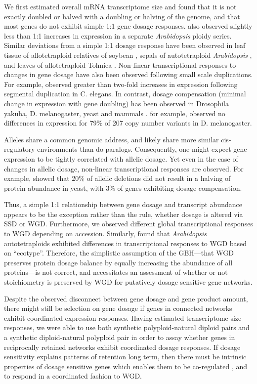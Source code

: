 \documentclass[11pt]{article}
\begin{document}
We first estimated overall mRNA transcriptome size and found that it is not exactly doubled or halved with a doubling or halving of the genome, and that most genes do not exhibit simple 1:1 gene dosage responses. \cite{hou2018} also observed slightly less than 1:1 increases in expression in a separate {\it Arabidopsis} ploidy series. Similar deviations from a simple 1:1 dosage response have been observed in leaf tissue of allotetraploid relatives of soybean \citep{coate2010}, sepals of autotetraploid {\it Arabidopsis} \citep{robinson2018}, and leaves of allotetraploid Tolmiea \citep{visger2019}. 
Non-linear transcriptional responses to changes in gene dosage have also been observed following small scale duplications. For example, \cite{konrad2018} observed greater than two-fold increases in expression following segmental duplication in C. elegans. In contrast, dosage compensation (minimal change in expression with gene doubling) has been observed in Drosophila yakuba, D. melanogaster, yeast and mammals \citep{qian2010, rogers2017, zhou2011}. \cite{zhou2011} for example, observed no differences in expression for 79\% of 207 copy number variants in D. melanogaster. 

Alleles share a common genomic address, and likely share more similar cis-regulatory environments than do paralogs. Consequently, one might expect gene expression to be tightly correlated with allelic dosage. Yet even in the case of changes in allelic dosage, non-linear transcriptional responses are observed. For example, \cite{springer2010} showed that 20\% of allelic deletions did not result in a halving of protein abundance in yeast, with 3\% of genes exhibiting dosage compensation. 

Thus, a simple 1:1 relationship between gene dosage and transcript abundance appears to be the exception rather than the rule, whether dosage is altered via SSD or WGD. Furthermore, we observed different global transcriptional responses to WGD depending on accession. Similarly, \cite{yu2010} found that {\it Arabidopsis} autotetraploids exhibited differences in transcriptional responses to WGD based on ``ecotype''. Therefore, the simplistic assumption of the GBH---that WGD preserves protein dosage balance by equally increasing the abundance of all proteins---is not correct, and necessitates an assessment of whether or not stoichiometry is preserved by WGD for putatively dosage sensitive gene networks.

Despite the observed disconnect between gene dosage and gene product amount, there might still be selection on gene dosage if genes in connected networks exhibit coordinated expression responses. Having estimated transcriptome size responses, we were able to use both synthetic polyploid-natural diploid pairs and a synthetic diploid-natural polyploid pair in order to assay whether genes in reciprocally retained networks exhibit coordinated dosage responses. If dosage sensitivity explains patterns of retention long term, then there must be intrinsic properties of dosage sensitive genes which enables  them to be co-regulated \citep{papp2003}, and to respond in a coordinated fashion to WGD.
\end{document}
